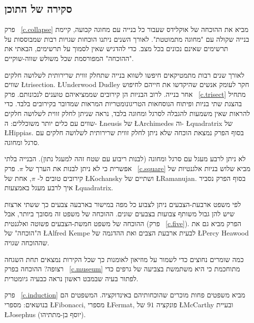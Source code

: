\subsection*{סקירה של התוכן}


פרק~%
\ref{c.collapse}
מביא את ההוכחה של אוקלידס שעבור כל בנייה עם מחוגה קבועה, קיימת בנייה שקולה עם "מחוגה מתמוטטת". לאורך השנים ניתנו הוכחות שגויות רבות שמבוססות על תרשימים שאינם נכונים בכל מצב. כדי להדגיש שאין לסמוך על תרשימים, הבאתי את "ההוכחה" המפורסמת שכל משולש שווה-שוקיים.

לאורך שנים רבות מתמטיקאים חיפשו לשווא בנייה שתחלק זווית שרירותית לשלושה חלקים שווים
\L{trisection}.
\L{Underwood Dudley}
חקר לעומק אנשים שהיקדשו את חייהם לחיפוש אחר בנייה. לרוב הבניות הן קירובים שממציאיהם טוענים לנכונותם. פרק~%
\ref{c.trisect}
מתחיל בהצגת שתי בניות ופיתוח הנוסחאות הטריגונומטריות המראות שמדובר בקירובים בלבד. כדי להראות שאין משמעות להגבלה לסרגל ומחוגה בלבד, נראה שניתן לחלק זווית לשלושה חלקים שווים עם כלים יותר משוכללים: ה-%
\L{neusis}
של
\L{Archimedes}
וה-%
\L{quadratrix}
של
\L{Hippias}.
בסוף הפרק נמצאת הוכחה שלא ניתן לחלק זווית שרירותית לשלושה חלקים עם סרגל ומחוגה.

לא ניתן לרבע מעגל עם סרגל ומחוגה (לבנות ריבוע עם שטח זהה למעגל נתון). הבנייה בלתי אפשרית כי לא ניתן לבנות את הערך של 
$\pi$.
פרק~%
\ref{c.square}
מביא שלוש בניות אלגנטיות של קירובים טובים ל-%
$\pi$,
אחת של
\L{Kochansky}
ושתיים של
\L{Ramanujan}.
בסוף הפרק נסביר איך לרבע מעגל באמצעות
\L{quadratrix}.


לפי משפט ארבעת-הצבעים ניתן לצבוע כל מפה במישור בארבעה צבעים כך ששתי ארצות שיש להן גבול משותף צבועות בצבעים שונים. ההוכחה של משפט זה מסובך ביותר, אבל ההוכחה של משפט חמשת-הצבעים פשוטה ואלגנטית (פרק%
~\ref{c.five}).
הפרק מביא גם את ה"הוכחה" של 
\L{Alfred Kempe}
לבעית ארבעת הצבים ואת ההדגמה של 
\L{Percy Heawood}
שההוכחה שגויה.


כמה שומרים נחוצים כדי לשמור על מוזיאון לאומנות כך שכל הקירות נמצאים תחת השגחה רצופה? ההוכחה בפרק%
~\ref{c.museum}
מתוחכמת כי היא משתמשת בצביעה של גרפים כדי לפתור בעיה שבמבט ראשון נראה כבעיה גיומטרית.


פרק~%
\ref{c.induction}
מביא משפטים פחות מוכרים שהוכחותיהם באינדוקציה. המשפטים הם בנושאים: מספרי 
\L{Fibonacci}, 
מספרי
\L{Fermat},
פונקציה 
$91$
של 
\L{McCarthy}
ובעיית
\L{Josephus}
(יוסף בן-מתתיהו).

